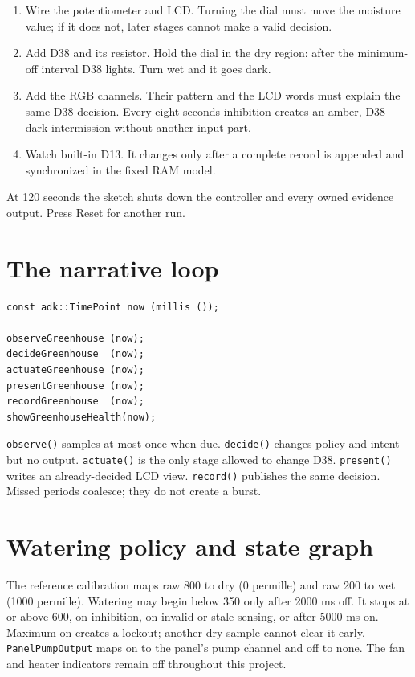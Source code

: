 \documentclass[11pt]{article}
\begin{document}
\begin{enumerate}
  \item Wire the potentiometer and LCD. Turning the dial must move the moisture
        value; if it does not, later stages cannot make a valid decision.
  \item Add D38 and its resistor. Hold the dial in the dry region: after the
        minimum-off interval D38 lights. Turn wet and it goes dark.
  \item Add the RGB channels. Their pattern and the LCD words must explain the
        same D38 decision. Every eight seconds inhibition creates an amber,
        D38-dark intermission without another input part.
  \item Watch built-in D13. It changes only after a complete record is appended
        and synchronized in the fixed RAM model.
\end{enumerate}

At 120 seconds the sketch shuts down the controller and every owned evidence
output. Press Reset for another run.

\section{The narrative loop}

\begin{lstlisting}[style=adkcpp]
const adk::TimePoint now (millis ());

observeGreenhouse (now);
decideGreenhouse  (now);
actuateGreenhouse (now);
presentGreenhouse (now);
recordGreenhouse  (now);
showGreenhouseHealth(now);
\end{lstlisting}

\texttt{observe()} samples at most once when due. \texttt{decide()} changes
policy and intent but no output. \texttt{actuate()} is the only stage allowed
to change D38. \texttt{present()} writes an already-decided LCD view.
\texttt{record()} publishes the same decision. Missed periods coalesce; they do
not create a burst.

\section{Watering policy and state graph}

The reference calibration maps raw 800 to dry (0 permille) and raw 200 to wet
(1000 permille). Watering may begin below 350 only after 2000 ms off. It stops
at or above 600, on inhibition, on invalid or stale sensing, or after 5000 ms
on. Maximum-on creates a lockout; another dry sample cannot clear it early.
\texttt{PanelPumpOutput} maps on to the panel's pump channel and off to none.
The fan and heater indicators remain off throughout this project.
\end{document}
